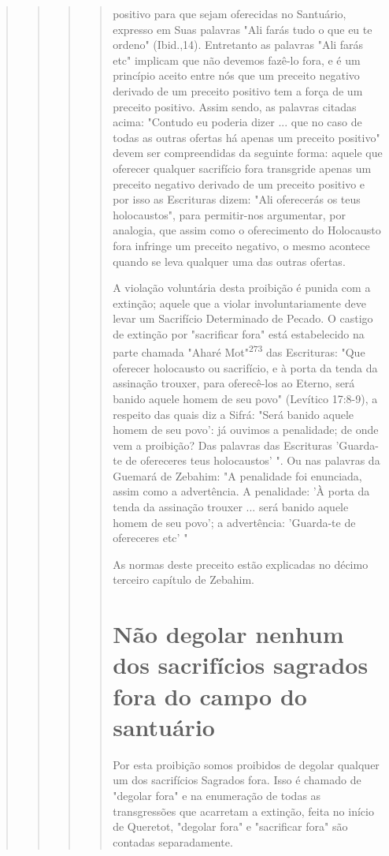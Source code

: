 \begin{quote}
\begin{quote}
\begin{quote}
\begin{quote}
positivo para que sejam oferecidas no Santuário, expresso em Suas
palavras "Ali farás tudo o que eu te ordeno" (Ibid.,14). Entretanto as
palavras "Ali farás etc" implicam que não devemos fazê-lo fora, e é um
princípio aceito entre nós que um preceito negativo derivado de um
preceito positivo tem a força de um pre­ceito positivo. Assim sendo, as
palavras citadas acima: "Contudo eu poderia dizer ... que no caso de
todas as outras ofertas há apenas um preceito positivo" devem ser
compreendidas da seguinte forma: aquele que oferecer qualquer
sa­crifício fora transgride apenas um preceito negativo derivado de um
preceito positivo e por isso as Escrituras dizem: "Ali oferecerás os
teus holocaustos", para permitir-nos argumentar, por analogia, que assim
como o oferecimento do Holocausto fora infringe um preceito negativo, o
mesmo acontece quando se leva qualquer uma das outras ofertas.

A violação voluntária desta proibição é punida com a extinção; aquele
que a violar involuntariamente deve levar um Sacrifício Determinado de
Peca­do. O castigo de extinção por "sacrificar fora" está estabelecido
na parte cha­mada "Aharé Mot"\textsuperscript{273} das Escrituras: "Que
oferecer holocausto ou sacrifício, e à porta da tenda da assinação
trouxer, para oferecê-los ao Eterno, será banido aquele homem de seu
povo" (Levítico 17:8-9), a respeito das quais diz a Sifrá: "Será banido
aquele homem de seu povo': já ouvimos a penalidade; de onde vem a
proibição? Das palavras das Escrituras 'Guarda-te de ofereceres teus
ho­locaustos' ". Ou nas palavras da Guemará de Zebahim: "A penalidade
foi enun­ciada, assim como a advertência. A penalidade: 'À porta da
tenda da assinação trouxer ... será banido aquele homem de seu povo'; a
advertência: 'Guarda-te de ofereceres etc' "

As normas deste preceito estão explicadas no décimo terceiro capí­tulo
de Zebahim.

\section{Não degolar nenhum dos sacrifícios sagrados fora do campo do santuário}

Por esta proibição somos proibidos de degolar qualquer um dos
sa­crifícios Sagrados fora. Isso é chamado de "degolar fora" e na
enumeração de todas as transgressões que acarretam a extinção, feita no
início de Queretot, "degolar fora" e "sacrificar fora" são contadas
separadamente.


\end{quote}
\end{quote}
\end{quote}
\end{quote}
